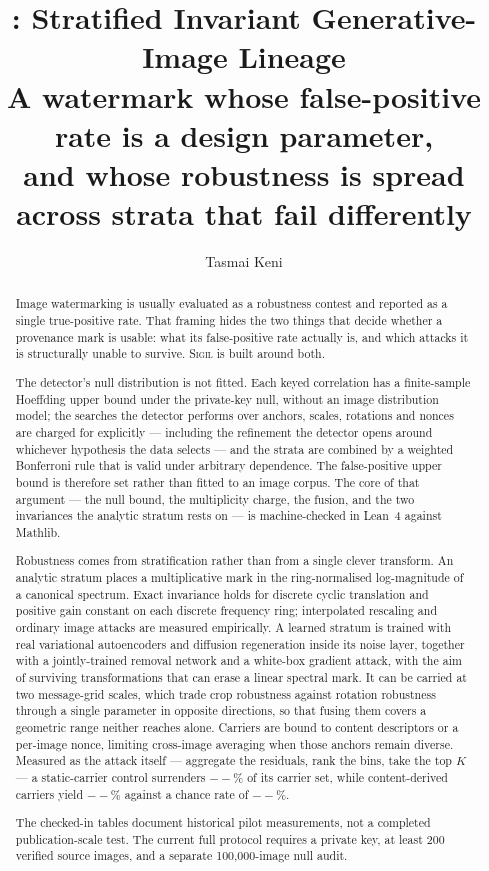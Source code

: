 \documentclass[10pt,twocolumn]{article}
\title{\bfseries\Large \sigil: Stratified Invariant Generative-Image Lineage\\[2pt]
\large A watermark whose false-positive rate is a design parameter,\\
and whose robustness is spread across strata that fail differently}
\author{Tasmai Keni}
\date{}
\theoremstyle{definition}
\theoremstyle{remark}
\newcommand{\sigil}{\textsc{Sigil}}
\providecommand{\sigilRecovered}{--}
\providecommand{\sigilRecoveredStatic}{--}
\providecommand{\sigilRecoveredChance}{--}
\begin{document}
\maketitle

\begin{abstract}
\noindent
Image watermarking is usually evaluated as a robustness contest and reported as a
single true-positive rate. That framing hides the two things that decide whether
a provenance mark is usable: what its false-positive rate actually is, and which
attacks it is structurally unable to survive. \sigil{} is built around both.

The detector's null distribution is not fitted. Each keyed correlation has a
finite-sample Hoeffding upper bound under the private-key null, without an image
distribution model; the searches the detector performs over anchors, scales,
rotations and nonces are charged for explicitly --- including the refinement
the detector opens around whichever hypothesis the data selects --- and the
strata are combined by a weighted Bonferroni rule that is valid under arbitrary
dependence. The
false-positive upper bound is therefore set rather than fitted to an image
corpus. The core of that argument --- the null bound, the
multiplicity charge, the fusion, and the two invariances the analytic stratum
rests on --- is machine-checked in Lean~4 against Mathlib.

Robustness comes from stratification rather than from a single clever transform.
An analytic stratum places a multiplicative mark in the ring-normalised
log-magnitude of a canonical spectrum. Exact invariance holds for discrete cyclic
translation and positive gain constant on each discrete frequency ring;
interpolated rescaling and ordinary image attacks are measured empirically.
A learned stratum is trained
with real variational autoencoders and diffusion regeneration inside its noise
layer, together with a jointly-trained removal network and a white-box gradient
attack, with the aim of surviving transformations that can erase a linear
spectral mark. It can be carried at two message-grid scales, which trade crop
robustness against rotation robustness through a single parameter in opposite
directions, so that fusing them covers a geometric range neither reaches alone.
Carriers are bound to content descriptors or a per-image nonce, limiting
cross-image averaging when those anchors remain diverse. Measured as the attack
itself --- aggregate the residuals, rank the bins, take the top $K$ --- a
static-carrier control surrenders $\sigilRecoveredStatic\%$ of its carrier set,
while content-derived carriers yield $\sigilRecovered\%$ against a chance rate of
$\sigilRecoveredChance\%$.

The checked-in tables document historical pilot measurements, not a completed
publication-scale test. The current full protocol requires a private key, at
least 200 verified source images, and a separate 100,000-image null audit.
\end{abstract}
\end{document}

